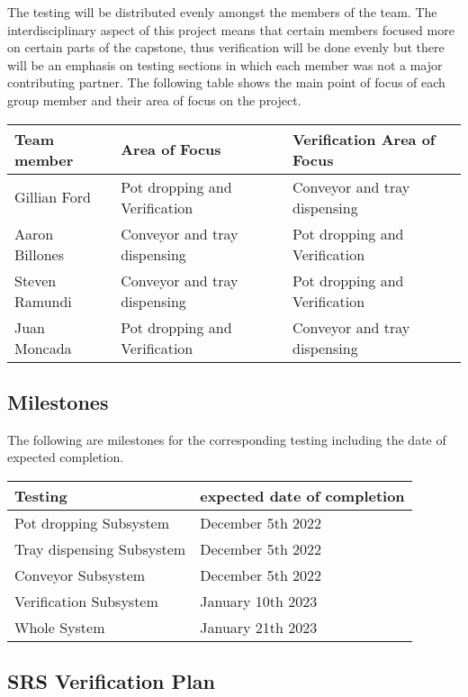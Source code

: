 \documentclass[12pt, titlepage]{article}
\begin{document}
The testing will be distributed evenly amongst the members of the team. The interdisciplinary aspect of this 
project means that certain members focused more on certain parts of the capstone, thus verification will be 
done evenly but there will be an emphasis on testing sections in which each member was not a major contributing partner.
The following table shows the main point of focus of each group member and their area of focus on the project.
\begin{center}
  \begin{tabular}{ |l|l|l| } 
    \hline
    \textbf{Team member} & \textbf{Area of Focus } & \textbf{Verification Area of Focus} \\ 
    \hline
    Gillian Ford   & Pot dropping and Verification & Conveyor and tray dispensing \\
    Aaron Billones & Conveyor and tray dispensing & Pot dropping and Verification \\
    Steven Ramundi & Conveyor and tray dispensing & Pot dropping and Verification \\
    Juan Moncada   & Pot dropping and Verification & Conveyor and tray dispensing\\
    \hline
  \end{tabular}
\end{center}

\subsection{Milestones}
The following are milestones for the corresponding testing including the date of expected completion. 
\begin{center}
  \begin{tabular}{ |l|l| } 
    \hline
    \textbf{Testing} & \textbf{expected date of completion } \\ 
    \hline
    Pot dropping Subsystem    & December 5th 2022 \\
    Tray dispensing Subsystem & December 5th 2022 \\
    Conveyor Subsystem        & December 5th 2022 \\
    Verification Subsystem    & January 10th 2023 \\
    Whole System              & January 21th 2023 \\

    \hline
  \end{tabular}
\end{center}

\subsection{SRS Verification Plan}
\end{document}
